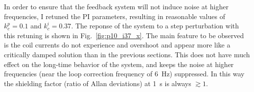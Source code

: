 In order to ensure that the feedback system will not induce noise at
higher frequencies, I retuned the PI parameters, resulting in
reasonable values of $k_c^p=0.1$ and $k_c^i=0.37$.  The reponse of the
system to a step perturbation with this retuning is shown in
Fig.~\ref{fig:p10_i37_x}.  The main feature to be observed is the
coil currents do not experience and overshoot and appear more like a
critically damped solution than in the previous sections.  This does
not have much effect on the long-time behavior of the system, and
keeps the noise at higher frequencies (near the loop correction
frequency of 6~Hz) suppressed.  In this way the shielding factor
(ratio of Allan deviations) at 1~s is always $\gtrsim 1$.





